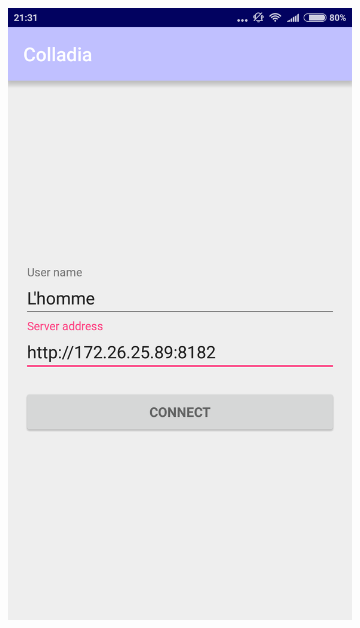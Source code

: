 \begin{itemize}
		\vspace*{\fill}
		\begin{figure}[!h]
			\centering
			\begin{subfigure}[t]{.3\textwidth}
				\includegraphics[width=\textwidth]{img/screen/colladia_connexion}
			\end{subfigure}
			~
			\begin{subfigure}[t]{.3\textwidth}

\end{subfigure}
\end{figure}
\end{itemize}
